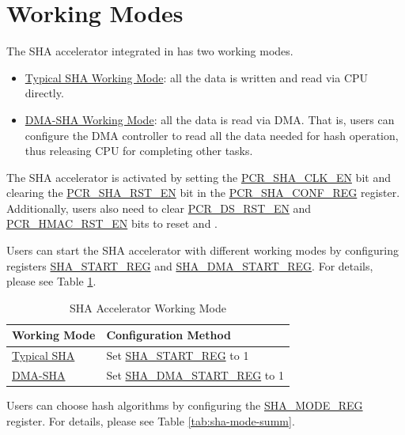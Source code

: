 \documentclass[main\_\_EN.tex]{subfiles}
\begin{document}
\section{Working Modes}
The SHA accelerator integrated in \chipname{} has two working modes.

\begin{itemize}
    \item \hyperref[sec:sha-typical-sha]{Typical SHA Working Mode}: all the data is written and read via CPU directly.
    \item \hyperref[sec:sha-dma-sha]{DMA-SHA Working Mode}: all the data is read via DMA. That is, users can configure the DMA controller to read all the data needed for hash operation, thus releasing CPU for completing other tasks.
\end{itemize}    

The SHA accelerator is activated by setting the \hyperref[fielddesc:PCRSHACLKEN]{PCR\_SHA\_CLK\_EN} bit and clearing the \hyperref[fielddesc:PCRSHARSTEN]{PCR\_SHA\_RST\_EN} bit in the \hyperref[regdesc:PCRSHACONFREG]{PCR\_SHA\_CONF\_REG} register. Additionally, users also need to clear \hyperref[fielddesc:PCRDSRSTEN]{PCR\_DS\_RST\_EN} and \hyperref[fielddesc:PCRHMACRSTEN]{PCR\_HMAC\_RST\_EN} bits to reset  and . 


Users can start the SHA accelerator with different working modes by configuring registers \hyperref[regdesc:SHASTARTREG]{SHA\_START\_REG} and \hyperref[regdesc:SHADMASTARTREG]{SHA\_DMA\_START\_REG}. For details, please see Table \ref{tab:sha-hash-algo-select}.
\begin{longtable}[c]{ | l | l | }
\caption{SHA Accelerator Working Mode}
\label{tab:sha-hash-algo-select}
\\\hline 
\rowcolor{lightgray}
\textbf{Working Mode}      & \textbf{Configuration Method}\\
    \hline
    \hyperref[sec:sha-typical-sha]{Typical SHA}      &  Set \hyperref[regdesc:SHASTARTREG]{SHA\_START\_REG} to 1   \\
    \hline
    \hyperref[sec:sha-dma-sha]{DMA-SHA}           &  Set \hyperref[regdesc:SHADMASTARTREG]{SHA\_DMA\_START\_REG} to 1   \\
    \hline
\end{longtable}

\clearpage
Users can choose hash algorithms by configuring the \hyperref[regdesc:SHAMODEREG]{SHA\_MODE\_REG} register. For details, please see Table \ref{tab:sha-mode-summ}.
\end{document}
